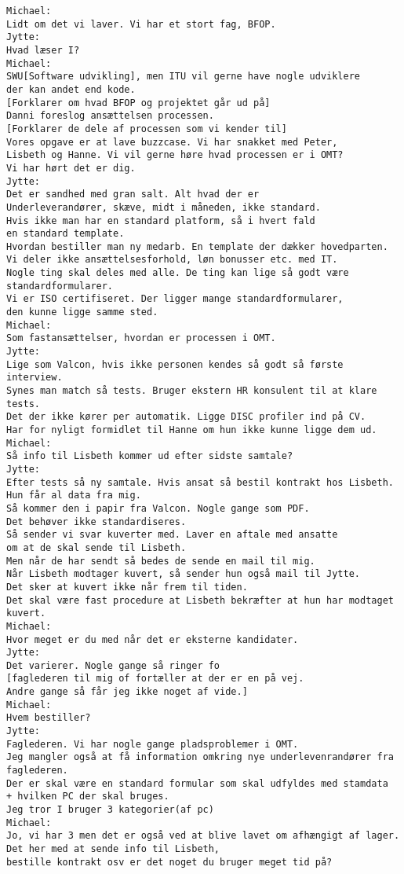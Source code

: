 \begin{verbatim}
Michael:
Lidt om det vi laver. Vi har et stort fag, BFOP.
Jytte:
Hvad læser I?
Michael:
SWU[Software udvikling], men ITU vil gerne have nogle udviklere
der kan andet end kode.
[Forklarer om hvad BFOP og projektet går ud på]
Danni foreslog ansættelsen processen. 
[Forklarer de dele af processen som vi kender til]
Vores opgave er at lave buzzcase. Vi har snakket med Peter,
Lisbeth og Hanne. Vi vil gerne høre hvad processen er i OMT?
Vi har hørt det er dig.
Jytte:
Det er sandhed med gran salt. Alt hvad der er
Underleverandører, skæve, midt i måneden, ikke standard.
Hvis ikke man har en standard platform, så i hvert fald
en standard template. 
Hvordan bestiller man ny medarb. En template der dækker hovedparten.
Vi deler ikke ansættelsesforhold, løn bonusser etc. med IT.
Nogle ting skal deles med alle. De ting kan lige så godt være
standardformularer.
Vi er ISO certifiseret. Der ligger mange standardformularer,
den kunne ligge samme sted.
Michael:
Som fastansættelser, hvordan er processen i OMT.
Jytte:
Lige som Valcon, hvis ikke personen kendes så godt så første interview. 
Synes man match så tests. Bruger ekstern HR konsulent til at klare tests.
Det der ikke kører per automatik. Ligge DISC profiler ind på CV. 
Har for nyligt formidlet til Hanne om hun ikke kunne ligge dem ud.
Michael:
Så info til Lisbeth kommer ud efter sidste samtale?
Jytte:
Efter tests så ny samtale. Hvis ansat så bestil kontrakt hos Lisbeth. 
Hun får al data fra mig.
Så kommer den i papir fra Valcon. Nogle gange som PDF.
Det behøver ikke standardiseres. 
Så sender vi svar kuverter med. Laver en aftale med ansatte
om at de skal sende til Lisbeth.
Men når de har sendt så bedes de sende en mail til mig. 
Når Lisbeth modtager kuvert, så sender hun også mail til Jytte.
Det sker at kuvert ikke når frem til tiden.
Det skal være fast procedure at Lisbeth bekræfter at hun har modtaget kuvert.
Michael:
Hvor meget er du med når det er eksterne kandidater.
Jytte:
Det varierer. Nogle gange så ringer fo
[faglederen til mig of fortæller at der er en på vej. 
Andre gange så får jeg ikke noget af vide.]
Michael:
Hvem bestiller?
Jytte:
Faglederen. Vi har nogle gange pladsproblemer i OMT.
Jeg mangler også at få information omkring nye underlevenrandører fra faglederen. 
Der er skal være en standard formular som skal udfyldes med stamdata
+ hvilken PC der skal bruges. 
Jeg tror I bruger 3 kategorier(af pc)
Michael:
Jo, vi har 3 men det er også ved at blive lavet om afhængigt af lager.
Det her med at sende info til Lisbeth,
bestille kontrakt osv er det noget du bruger meget tid på?

\end{verbatim}
